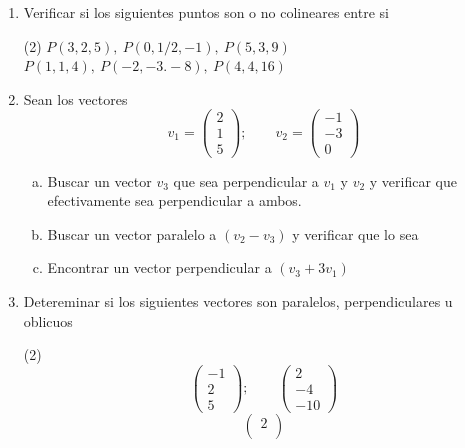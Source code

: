 \documentclass[12pt]{article}
\newenvironment{preguntas}
{\begin{enumerate}\itemsep12pt
	}
	{
	\end{enumerate}
}
\begin{document}
\begin{preguntas}
$$\begin{pmatrix}
	3
\end{pmatrix}; \qquad
	v_4 = \begin{pmatrix}
	13\\
	-3\\
	1
\end{pmatrix},
	 $$
\begin{tasks}(4)
\task $v_1 + v_2$
\task $v_3 - v_4$
\task $v_2 \cdot v_3$
\task $v_1 \times v_2$
\task $v_2 \times v_1$
\task $(v_1 \times v_2) \cdot v_2$
\task $3 - ((2v_1) \cdot v_2)$
\task $v_2 - v_3 \times v_1$
\end{tasks}
\item Verificar si los siguientes puntos son o no colineares entre si
\begin{tasks}(2)
\task $P(3,2,5), \ P(0, 1/2, -1), \ P(5, 3, 9)$
\task $P(1,1,4), \ P(-2,-3.-8), \ P(4,4,16)$
\end{tasks}
\item Sean los vectores
		$$
	v_1 = \begin{pmatrix}
	2\\
	1\\
	5
\end{pmatrix};\qquad
	v_2 = \begin{pmatrix}
	-1\\
	-3\\
	0
\end{pmatrix}$$
\begin{enumerate}[a)]
\item Buscar un vector $v_3$ que sea perpendicular a $v_1$ y $v_2$ y verificar que efectivamente sea perpendicular a ambos.
\item Buscar un vector paralelo a $(v_2-v_3)$ y verificar que lo sea
\item Encontrar un vector perpendicular a $(v_3 + 3v_1)$
\end{enumerate}
\item Detereminar si los siguientes vectores son paralelos, perpendiculares u oblicuos
\begin{tasks}(2)
\task $$ 
			\begin{pmatrix}
			-1\\
			2\\
			5
		\end{pmatrix};\qquad
			\begin{pmatrix}
			2\\
			-4\\
			-10
		\end{pmatrix}$$
\task  $$ 
			\begin{pmatrix}
			2\\

\end{pmatrix}$$
\end{tasks}
\end{preguntas}
\end{document}
